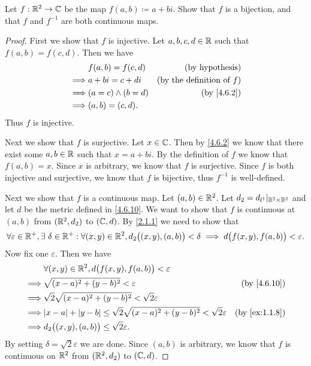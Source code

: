 \begin{ex}\label{ex:4.6.11}
  Let \(f : \mathbb{R}^2 \to \mathbb{C}\) be the map \(f(a, b) \coloneqq a + bi\).
  Show that \(f\) is a bijection, and that \(f\) and \(f^{-1}\) are both continuous maps.
\end{ex}

\begin{proof}
  First we show that \(f\) is injective.
  Let \(a, b, c, d \in \mathbb{R}\) such that \(f(a, b) = f(c, d)\).
  Then we have
  \begin{align*}
             & f(a, b) = f(c, d)     & \text{(by hypothesis)}              \\
    \implies & a + bi = c + di       & \text{(by the definition of \(f\))} \\
    \implies & (a = c) \land (b = d) & \text{(by \cref{4.6.2})}            \\
    \implies & (a, b) = (c, d).
  \end{align*}
  Thus \(f\) is injective.

  Next we show that \(f\) is surjective.
  Let \(x \in \mathbb{C}\).
  Then by \cref{4.6.2} we know that there exist some \(a, b \in \mathbb{R}\) such that \(x = a + bi\).
  By the definition of \(f\) we know that \(f(a, b) = x\).
  Since \(x\) is arbitrary, we know that \(f\) is surjective.
  Since \(f\) is both injective and surjective, we know that \(f\) is bijective, thus \(f^{-1}\) is well-defined.

  Next we show that \(f\) is a continuous map.
  Let \((a, b) \in \mathbb{R}^2\).
  Let \(d_2 = d_{l^1}|_{\mathbb{R}^2 \times \mathbb{R}^2}\) and let \(d\) be the metric defined in \cref{4.6.10}.
  We want to show that \(f\) is continuous at \((a, b)\) from \((\mathbb{R}^2, d_2)\) to \((\mathbb{C}, d)\).
  By \cref{2.1.1} we need to show that
  \[
    \forall \varepsilon \in \mathbb{R}^+, \exists\ \delta \in \mathbb{R}^+ : \forall (x, y) \in \mathbb{R}^2, d_2\big((x, y), (a, b)\big) < \delta \implies d\big(f(x, y), f(a, b)\big) < \varepsilon.
  \]
  Now fix one \(\varepsilon\).
  Then we have
  \begin{align*}
             & \forall (x, y) \in \R^2, d\big(f(x, y), f(a, b)\big) < \varepsilon                                                        \\
    \implies & \sqrt{(x - a)^2 + (y - b)^2} < \varepsilon                                                  & \text{(by \cref{4.6.10})}   \\
    \implies & \sqrt{2} \sqrt{(x - a)^2 + (y - b)^2} < \sqrt{2} \varepsilon                                                              \\
    \implies & \abs{x - a} + \abs{y - b} \leq \sqrt{2} \sqrt{(x - a)^2 + (y - b)^2} < \sqrt{2} \varepsilon & \text{(by \cref{ex:1.1.8})} \\
    \implies & d_2\big((x, y), (a, b)\big) \leq \sqrt{2} \varepsilon.
  \end{align*}
  By setting \(\delta = \sqrt{2} \varepsilon\) we are done.
  Since \((a, b)\) is arbitrary, we know that \(f\) is continuous on \(\mathbb{R}^2\) from \((\mathbb{R}^2, d_2)\) to \((\mathbb{C}, d)\).


\end{proof}
